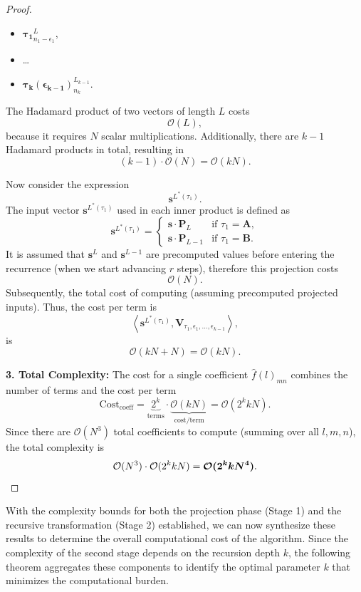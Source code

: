 \documentclass[11pt]{article}
\theoremstyle{definition}
\theoremstyle{remark}
\numberwithin{equation}{section}
\begin{document}
\begin{proof}
\begin{itemize}
    \item $\mathbf{\tau_1}_{n_1 - \epsilon_1}^{L}$,
    \item \dots
    \item $\mathbf{\tau_k(\epsilon_{k-1})}_{n_k}^{L_{k-1}}$.
\end{itemize}

The Hadamard product of two vectors of length $L$ costs
\[
\mathcal{O}(L),
\]
because it requires $N$ scalar multiplications. Additionally, there are $k - 1$ Hadamard products in total, resulting in
\[
(k-1) \cdot \mathcal{O}(N) = \mathcal{O}(kN).
\]

Now consider the expression
\[
\mathbf{s}^{L^*(\tau_1)}.
\]
The input vector $\mathbf{s}^{L^*(\tau_1)}$ used in each inner product is defined as
\[
 \mathbf{s}^{L^*(\tau_1)} = 
 \begin{cases} 
 \mathbf{s} \cdot \mathbf{P}_L & \text{if } \tau_1 = \mathbf{A}, \\
 \mathbf{s} \cdot \mathbf{P}_{L-1} & \text{if } \tau_1 = \mathbf{B}.
 \end{cases}
\]
It is assumed that $\mathbf{s}^L$ and $\mathbf{s}^{L-1}$ are precomputed values before entering the recurrence (when we start advancing $r$ steps), therefore this projection costs 
\[
\mathcal{O}(N).
\]
Subsequently, the total cost of computing (assuming precomputed projected inputs).  Thus, the cost per term is
\[
\left\langle \mathbf{s}^{L^*(\tau_1)}, \mathbf{V}_{\tau_1, \epsilon_1, \ldots, \epsilon_{k-1}} \right\rangle,
\]
is
\[
   \mathcal{O}(kN + N) = \mathcal{O}(kN).
\]

\textbf{3. Total Complexity:}
The cost for a single coefficient $\hat{f}(l)_{mn}$ combines the number of terms and the cost per term
\begin{equation*}
    \text{Cost}_{\text{coeff}} = \underbrace{2^k}_{\text{terms}} \cdot \underbrace{\mathcal{O}(kN)}_{\text{cost/term}} = \mathcal{O}(2^k k N).
\end{equation*}
Since there are $\mathcal{O}(N^3)$ total coefficients to compute (summing over all $l, m, n$), the total complexity is
\begin{equation*}
    \mathcal{O}(N^3) \cdot \mathcal{O}(2^k k N) = \boldsymbol{\mathcal{O}(2^k k N^4)}. \qedhere
\end{equation*}
\end{proof}

With the complexity bounds for both the projection phase (Stage 1) and the recursive transformation (Stage 2) established, we can now synthesize these results to determine the overall computational cost of the algorithm. Since the complexity of the second stage depends on the recursion depth $k$, the following theorem aggregates these components to identify the optimal parameter $k$ that minimizes the computational burden.
\end{document}
